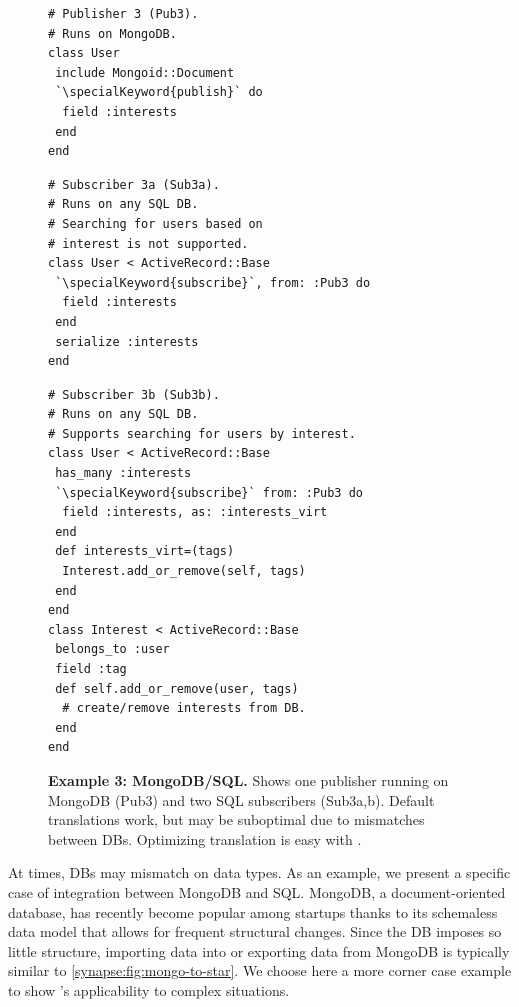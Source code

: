 \begin{figure}
\centering
\begin{minipage}{.45\textwidth}
  \begin{rbox}
\begin{lstlisting}
# Publisher 3 (Pub3).
# Runs on MongoDB.
class User
 include Mongoid::Document
 `\specialKeyword{publish}` do
  field :interests
 end
end
\end{lstlisting}
\end{rbox}
  \begin{rbox}
\begin{lstlisting}
# Subscriber 3a (Sub3a).
# Runs on any SQL DB.
# Searching for users based on
# interest is not supported.
class User < ActiveRecord::Base
 `\specialKeyword{subscribe}`, from: :Pub3 do
  field :interests
 end
 serialize :interests
end
\end{lstlisting}
\end{rbox}
\end{minipage}
\hspace{2em}
\begin{minipage}{.45\textwidth}
  \begin{rbox}
\begin{lstlisting}
# Subscriber 3b (Sub3b).
# Runs on any SQL DB.
# Supports searching for users by interest.
class User < ActiveRecord::Base
 has_many :interests
 `\specialKeyword{subscribe}` from: :Pub3 do
  field :interests, as: :interests_virt
 end
 def interests_virt=(tags)
  Interest.add_or_remove(self, tags)
 end
end
class Interest < ActiveRecord::Base
 belongs_to :user
 field :tag
 def self.add_or_remove(user, tags)
  # create/remove interests from DB.
 end
end
\end{lstlisting}
\end{rbox}
\end{minipage}
\caption{{\bf Example 3: MongoDB/SQL.}
Shows one publisher running on MongoDB (Pub3) and two SQL subscribers
(Sub3a,b).  Default translations work, but may be suboptimal due to
mismatches between DBs.  Optimizing translation is easy with \synapse.
}
\label{synapse:fig:mongo-sql}
\end{figure}

At times, DBs may mismatch on data types.  As an example, we present a specific
case of integration between MongoDB and SQL.
MongoDB, a document-oriented database, has recently become popular among startups
 thanks to its schemaless data model that allows for frequent
structural changes.  Since the DB imposes so little structure, importing data
into or exporting data from MongoDB is typically similar to
\F\ref{synapse:fig:mongo-to-star}.  We choose here a more corner case example to
show \synapse's applicability to complex situations.

